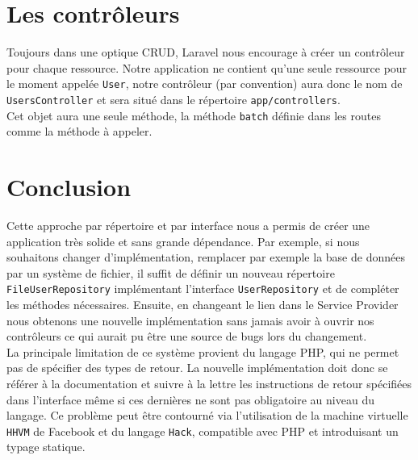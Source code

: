 \section{Les contrôleurs}
	Toujours dans une optique CRUD, Laravel nous encourage à créer un contrôleur pour chaque ressource. Notre application ne contient qu'une seule ressource pour le moment appelée \verb|User|, notre contrôleur (par convention) aura donc le nom de \verb|UsersController| et sera situé dans le répertoire \verb|app/controllers|.\\

	Cet objet aura une seule méthode, la méthode \verb|batch| définie dans les routes comme la méthode à appeler.

\section{Conclusion}
	Cette approche par répertoire et par interface nous a permis de créer une application très solide et sans grande dépendance. Par exemple, si nous souhaitons changer d'implémentation, remplacer par exemple la base de données par un système de fichier, il suffit de définir un nouveau répertoire \verb|FileUserRepository| implémentant l'interface \verb|UserRepository| et de compléter les méthodes nécessaires. Ensuite, en changeant le lien dans le Service Provider nous obtenons une nouvelle implémentation sans jamais avoir à ouvrir nos contrôleurs ce qui aurait pu être une source de bugs lors du changement.\\

	La principale limitation de ce système provient du langage PHP, qui ne permet pas de spécifier des types de retour. La nouvelle implémentation doit donc se référer à la documentation et suivre à la lettre les instructions de retour spécifiées dans l'interface même si ces dernières ne sont pas obligatoire au niveau du langage. Ce problème peut être contourné via l'utilisation de la machine virtuelle \verb|HHVM| de Facebook et du langage \verb|Hack|, compatible avec PHP et introduisant un typage statique.